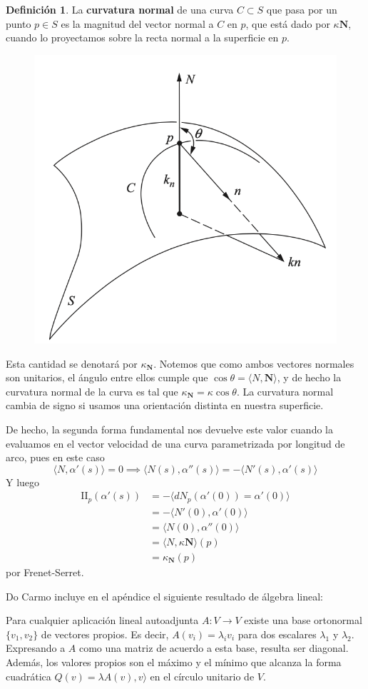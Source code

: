 \documentclass[spanish]{book}
\theoremstyle{definition}
\newtheorem*{defn}{Definición}
\begin{document}
\begin{defn}
	La \textbf{curvatura normal} de una curva $C\subset S$  que pasa por un punto $p\in S$ es la magnitud del vector normal a $C$ en $p$, que está dado por $\kappa\mathbf{N}$, cuando lo proyectamos sobre la recta normal a la superficie en $p$.
\end{defn}
\begin{figure}
	\centering
	\includegraphics[width=0.5\linewidth]{gauss2}
\end{figure}
Esta cantidad se denotará por $\kappa_\mathbf{N}$. Notemos que como ambos vectores normales son unitarios, el ángulo entre ellos cumple que $\cos\theta=\langle N,\mathbf{{N}}\rangle$, y de hecho la curvatura normal de la curva es tal que $\kappa_\mathbf{{N}}=\kappa\cos\theta$. La curvatura normal cambia de signo si usamos una orientación distinta en nuestra superficie.

De hecho, la segunda forma fundamental nos devuelve este valor cuando la evaluamos en el vector velocidad de una curva parametrizada por longitud de arco, pues en este caso
\[\langle N,\alpha'(s)\rangle=0\implies\langle N(s),\alpha''(s)\rangle=-\langle N'(s),\alpha'(s)\rangle\]
Y luego
\begin{align*}
	\mathrm{I\!I}_p(\alpha'(s))&=-\langle dN_p(\alpha'(0))=\alpha'(0)\rangle\\
	&=-\langle N'(0),\alpha'(0)\rangle\\
	&=\langle N(0),\alpha''(0)\rangle\\
	&=\langle N,\kappa\mathbf{N}\rangle(p)\\
	&=\kappa_\mathbf{N}(p)
\end{align*}
por Frenet-Serret.

Do Carmo incluye en el apéndice el siguiente resultado de álgebra lineal:

Para cualquier aplicación lineal autoadjunta $A:V\to V$ existe una base ortonormal $\{v_1,v_2\}$ de vectores propios. Es decir, $A(v_i)=\lambda_iv_i$ para dos escalares $\lambda_1$ y $\lambda_2$. Expresando a $A$ como una matriz de acuerdo a esta base, resulta ser diagonal. Además, los valores propios son el máximo y el mínimo que alcanza la forma cuadrática $Q(v)=\lambda A(v),v\rangle$ en el círculo unitario de $V$.
\end{document}
